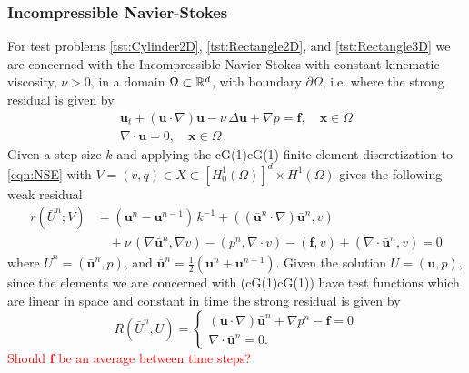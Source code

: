 \subsubsection{Incompressible Navier-Stokes}
For test problems \ref{tst:Cylinder2D}, \ref{tst:Rectangle2D}, and
\ref{tst:Rectangle3D} we are concerned with the Incompressible Navier-Stokes
with constant kinematic viscosity, $\nu>0$, in a domain $\Omega\subset \mathbb{R}^d$,
with boundary $\partial \Omega$, i.e.
where the strong residual is given by
\begin{equation}
    \begin{split}
      \mathbf{u}_t + \left( \mathbf{u} \cdot \nabla \right) \mathbf{u} - \nu\,
          \Delta \mathbf{u} + \nabla p = \mathbf{f}, \quad \mathbf{x} \in \Omega \\
          \nabla \cdot \mathbf{u} = 0, \quad \mathbf{x} \in \Omega
    \end{split}
  \label{eqn:NSE}
\end{equation}
Given a step size $k$ and applying the cG(1)cG(1) finite element discretization
to \eqref{eqn:NSE} with $V = (v, q) \in X \subset [H^1_0(\Omega)]^d \times
H^1(\Omega)$ gives the following weak residual
\begin{equation}
  \begin{split}
    r(\bar{U}^n; V) &= \left(\mathbf{u}^n - \mathbf{u}^{n-1}\right)\,k^{-1}
        + (\left( \bar{\mathbf{u}}^n \cdot \nabla \right) \bar{\mathbf{u}}^n, v) \\
        &\quad+ \nu\, (\nabla \bar{\mathbf{u}}^n, \nabla v)
        - (p^n, \nabla \cdot v) - (\mathbf{f}, v)
        + (\nabla \cdot \bar{\mathbf{u}}^n, v) = 0
  \end{split}
  \label{eqn:WeakNSE}
\end{equation}
where $\bar{U}^n = (\bar{\mathbf{u}}^n,p)$, and $\bar{\mathbf{u}}^n =
\frac{1}{2}\left(\mathbf{u}^n + \mathbf{u}^{n-1}\right)$. Given the solution
$U=(\mathbf{u},p)$, since the elements we are concerned with (cG(1)cG(1)) have
test functions which are linear in space and constant in time the strong
residual is given by
\begin{equation}
    R(\bar{U}^n,U) = \begin{cases}
      \left(\mathbf{u} \cdot \nabla \right) \bar{\mathbf{u}}^n
        + \nabla p^n - \mathbf{f} = 0 \\
      \nabla \cdot \bar{\mathbf{u}}^n = 0.
    \end{cases}
  \label{eqn:StrongNSE}
\end{equation}
\textcolor{red}{Should $\mathbf{f}$ be an average between time steps?}
